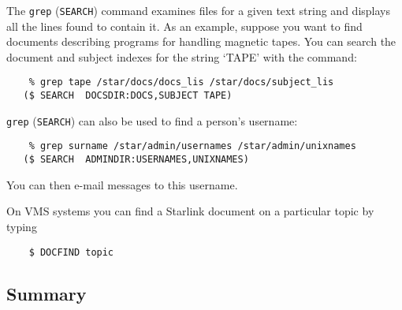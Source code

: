 The {\tt grep} ({\tt SEARCH}) command examines files for a given text string
and displays all the lines found to contain it.
As an example, suppose you want to find documents describing programs for
handling magnetic tapes.
You can search the document and subject indexes for the string `TAPE' with the
command:
{\small
\begin{verbatim}
    % grep tape /star/docs/docs_lis /star/docs/subject_lis
   ($ SEARCH  DOCSDIR:DOCS,SUBJECT TAPE)
\end{verbatim}
}
{\tt grep} ({\tt SEARCH}) can also be used to find a person's username:
{\small
\begin{verbatim}
    % grep surname /star/admin/usernames /star/admin/unixnames
   ($ SEARCH  ADMINDIR:USERNAMES,UNIXNAMES)
\end{verbatim}
}
You can then e-mail messages to this username.

On VMS systems you can find a Starlink document on a particular topic by typing
\begin{verbatim}
    $ DOCFIND topic
\end{verbatim}

\subsection{Summary}

